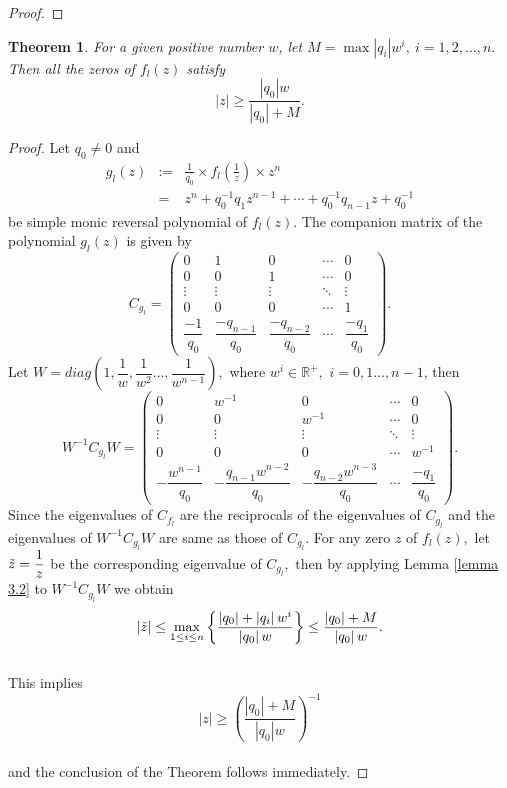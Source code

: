 \documentclass [12pt]{article}
\newtheorem{theorem}{Theorem}
[section]
\begin{document}
\begin{proof}
\end{proof}
\begin{theorem}\label{th:02}
	For a given positive number $w$, let $M= \max |q_i|w^i, ~i=1,2,\dots,n.$ Then all the zeros of  $f_{l}(z)$ satisfy $$\left|z \right| \geq \frac{\left|q_0\right|w}{\left|q_0\right| + M}.$$
\end{theorem}


\begin{proof} Let $q_{0}\ne 0$ and \begin{eqnarray*}
		g_{l}(z)&:= &\frac{1}{q_{0}} \times f_{l}\left(\frac{1}{z}\right) \times z^{n} \\ &=& z^{n} + q_{0}^{-1}q_{1}z^{n-1} + \cdots + q_{0}^{-1}q_{n-1}z + q_{0}^{-1}
	\end{eqnarray*} be simple monic reversal polynomial of $f_{l}(z).$
	The companion matrix of the polynomial $g_{l}(z)$ is given by \\
	
	\[
	C_{g_l} = 
	\begin{pmatrix}
		0 & 1 & 0 & \cdots & 0 \\
		0 & 0 & 1 & \cdots & 0 \\
		\vdots & \vdots & \vdots & \ddots & \vdots \\
		0 & 0 & 0 & \cdots & 1 \\
		\dfrac{-1}{q_{0}} & \dfrac{-q_{n-1}}{q_{0}} & \dfrac{-q_{n-2}}{q_{0}} & \cdots & \dfrac{-q_{1}}{q_{0}}
	\end{pmatrix}.
	\]
	Let $W=diag\left(1,\dfrac{1}{w},\dfrac{1}{w^{2}}\dots,\dfrac{1}{w^{n-1}}\right),$ where $w^{i} \in \mathbb{R}^+,$ $i=0,1\dots,n-1$, then
	\[
	W^{-1} C_{g_l} W = 
	\begin{pmatrix}
		0 & w^{-1} & 0 & \cdots & 0 \\
		0 & 0 & w^{-1} & \cdots & 0 \\
		\vdots & \vdots & \vdots & \ddots & \vdots \\
		0 & 0 & 0 & \cdots & w^{-1} \\
		-\dfrac{w^{n-1}}{q_{0}}  & -\dfrac{q_{n-1}w^{n-2}}{q_{0}}& -\dfrac{q_{n-2}w^{n-3}}{q_{0}} & \cdots & \dfrac{-q_{1}}{q_{0}}
	\end{pmatrix}.
	\]
	Since the eigenvalues of $C_{f_{l}}$ are the reciprocals of the eigenvalues of $C_{g_l}$ and the eigenvalues of $W^{-1} C_{g_l} W$  are same as those of $C_{g_l}$. For any zero $z$ of 
	$f_{l}(z),$ let $\Tilde{z}=\dfrac{1}{z}$ be the corresponding eigenvalue of $C_{g_l},$ then 
	by	 applying Lemma \ref{lemma 3.2}  to $W^{-1} C_{g_l} W$ we obtain       
	$$\left|\Tilde{z} \right| \leq \max_{1\le i\le n} \left\{ \frac{ \left|q_0\right| + \left|q_i\right|w^{i}}{\left|q_0\right|w}\right\} \leq  \frac{\left|q_0\right| + M}{\left|q_0\right|w}.$$\\
	This implies\\
	$$\left|{z} \right| \geq  \left(\frac{\left|q_0\right| + M}{\left|q_0\right|w}\right)^{-1}$$\\
	and the conclusion of the Theorem follows immediately.
\end{proof}
\end{document}
